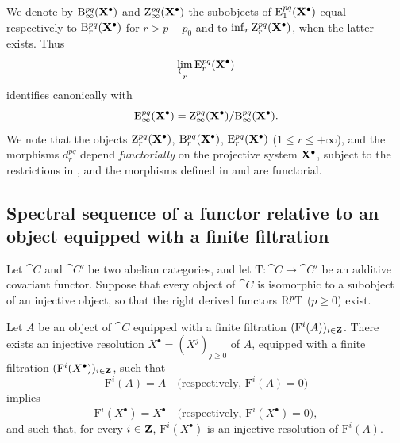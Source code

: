 \begin{env}[13.5.7]
\label{0.13.5.7}
We denote by
$\mathrm{B}_\infty^{pq}(\mathbf{X}^\bullet)$ and
$\mathrm{Z}_\infty^{pq}(\mathbf{X}^\bullet)$ the subobjects of
$\mathrm{E}_1^{pq}(\mathbf{X}^\bullet)$ equal respectively to
$\mathrm{B}_r^{pq}(\mathbf{X}^\bullet)$ for $r>p-p_0$ and to
$\inf_r\mathrm{Z}_r^{pq}(\mathbf{X}^\bullet)$, when the latter exists.
Thus
\[
  \varprojlim_r\mathrm{E}_r^{pq}(\mathbf{X}^\bullet)
\]
identifies canonically with
\[
  \mathrm{E}_\infty^{pq}(\mathbf{X}^\bullet)
  =
  \mathrm{Z}_\infty^{pq}(\mathbf{X}^\bullet)/
  \mathrm{B}_\infty^{pq}(\mathbf{X}^\bullet).
\]
We note that the objects
$\mathrm{Z}_r^{pq}(\mathbf{X}^\bullet)$,
$\mathrm{B}_r^{pq}(\mathbf{X}^\bullet)$,
$\mathrm{E}_r^{pq}(\mathbf{X}^\bullet)$
($1\leq r\leq+\infty$), and the morphisms $d_r^{pq}$ depend
\emph{functorially} on the projective system $\mathbf{X}^\bullet$, subject
to the restrictions in , and the morphisms defined in
 and  are functorial.
\end{env}

\subsection{Spectral sequence of a functor relative to an object equipped with a finite filtration}
\label{subsection:0.13.6}

\begin{env}[13.6.1]
\label{0.13.6.1}
Let $\cat{C}$ and $\cat{C}'$ be two abelian categories, and let
$\mathrm{T}:\cat{C}\longrightarrow\cat{C}'$ be an additive covariant
functor.
Suppose that every object of $\cat{C}$ is isomorphic to a subobject of
an injective object, so that the right derived functors
$\mathrm{R}^p\mathrm{T}$ ($p\geq0$) exist.
\end{env}

\begin{lemma}[13.6.2]
\label{0.13.6.2}
Let $A$ be an object of $\cat{C}$ equipped with a finite filtration
$(\mathrm{F}^i(A))_{i\in\mathbf{Z}}$.
There exists an injective resolution
$X^\bullet=(X^j)_{j\geq0}$ of $A$, equipped with a finite filtration
$(\mathrm{F}^i(X^\bullet))_{i\in\mathbf{Z}}$, such that
\[
  \mathrm{F}^i(A)=A
  \quad\text{(respectively, }\mathrm{F}^i(A)=0\text{)}
\]
implies
\[
  \mathrm{F}^i(X^\bullet)=X^\bullet
  \quad\text{(respectively, }\mathrm{F}^i(X^\bullet)=0\text{)},
\]
and such that, for every $i\in\mathbf{Z}$,
$\mathrm{F}^i(X^\bullet)$ is an injective resolution of
$\mathrm{F}^i(A)$.
\end{lemma}


